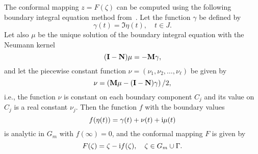 The conformal mapping $z=F(\zeta)$ can be computed using the following boundary integral equation method from~\cite{Nas-Siam1}. Let the function $\gamma$ be defined by
\begin{equation}\label{eq:gam}
\gamma(t)=\Im\eta(t), \quad t\in J.
\end{equation}
Let also $\mu$ be the unique solution of the boundary integral equation with the Neumann kernel
\begin{equation}\label{eq:ie-g}
({\bf I}-{\bf N})\mu=-{\bf M}\gamma,
\end{equation}
and let the piecewise constant function $\nu=(\nu_1,\nu_2,\ldots,\nu_\ell)$ be given by
\begin{equation}\label{eq:h-g}
\nu=\left({\bf M}\mu-({\bf I}-{\bf N})\gamma\right)/2,
\end{equation}
i.e., the function $\nu$ is constant on each boundary component $C_j$ and its value on $C_j$ is a real constant $\nu_j$.
Then the function $f$ with the boundary values
\begin{equation}\label{eq:f-rec}
f(\eta(t))=\gamma(t)+\nu(t)+\mathrm{i}\mu(t)
\end{equation}
is analytic in $G_m$ with $f(\infty)=0$, and the conformal mapping $F$ is 
given by
\begin{equation}\label{eqn:omega-app}
F(\zeta)=\zeta-\mathrm{i} f(\zeta), \quad \zeta\in G_m\cup\Gamma.
\end{equation} 



